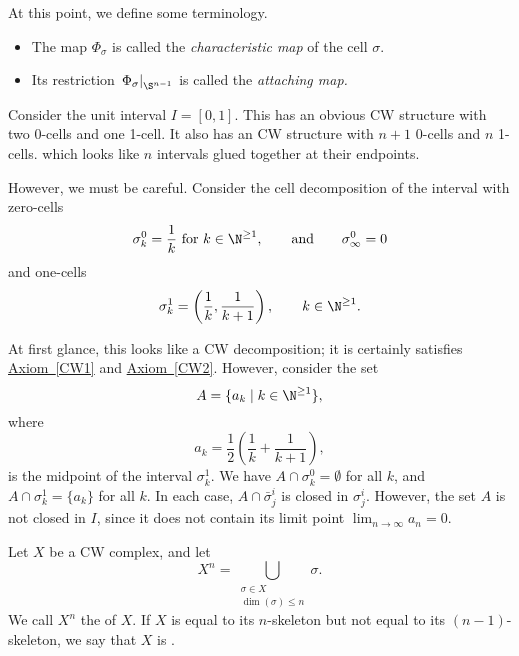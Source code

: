 \documentclass[main.tex]{subfiles}
\begin{document}
At this point, we define some terminology.
\begin{itemize}
  \item The map $\Phi_{\sigma}$ is called the \emph{characteristic map} of the cell $\sigma$.

  \item Its restriction $\left. \Phi_{\sigma} \right|_{\S^{n-1}}$ is called the \emph{attaching map.}
\end{itemize}

\begin{example}
  Consider the unit interval $I = [0, 1]$. This has an obvious CW structure with two 0-cells and one 1-cell. It also has an CW structure with $n+1$ 0-cells and $n$ 1-cells. which looks like $n$ intervals glued together at their endpoints.

  However, we must be careful. Consider the cell decomposition of the interval with zero-cells
  \begin{equation*}
    \sigma^{0}_{k} = \frac{1}{k}\text{ for } k \in \N^{\geq 1},\qquad \text{and}\qquad \sigma^{0}_{\infty} = 0
  \end{equation*}
  and one-cells
  \begin{equation*}
    \sigma^{1}_{k} = \left( \frac{1}{k}, \frac{1}{k+1} \right),\qquad k \in \N^{\geq 1}.
  \end{equation*}

  At first glance, this looks like a CW decomposition; it is certainly satisfies \hyperref[CW1]{Axiom~\ref*{CW1}} and \hyperref[CW2]{Axiom~\ref*{CW2}}. However, consider the set
  \begin{equation*}
    A = \{a_{k}\mid k \in \N^{\geq 1} \},
  \end{equation*}
  where
  \begin{equation*}
    a_{k} = \frac{1}{2}\left( \frac{1}{k} + \frac{1}{k+1} \right),
  \end{equation*}
  is the midpoint of the interval $\sigma^{1}_{k}$. We have $A \cap \sigma^{0}_{k} = \emptyset$ for all $k$, and $A \cap \sigma^{1}_{k} = \{a_{k}\}$ for all $k$. In each case, $A \cap \bar{\sigma}^{i}_{j}$ is closed in $\sigma^{i}_{j}$. However, the set $A$ is not closed in $I$, since it does not contain its limit point $\lim_{n \to \infty} a_{n} = 0$.
\end{example}

\begin{definition}
  \label{def:skeleton}
  Let $X$ be a CW complex, and let
  \begin{equation*}
    X^{n} = \bigcup_{\substack{\sigma \in X \\ \dim(\sigma) \leq n}} \sigma.
  \end{equation*}
  We call $X^{n}$ the  of $X$. If $X$ is equal to its $n$-skeleton but not equal to its $(n-1)$-skeleton, we say that $X$ is .
\end{definition}
\end{document}
